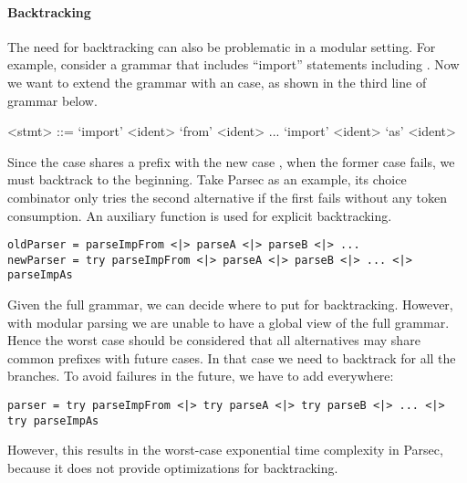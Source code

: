 \paragraph{Backtracking} The need for backtracking can also be problematic
in a modular setting. For example, consider a grammar that includes
``import'' statements including .
Now we want to extend the grammar with an  case, as shown in the third line of grammar below.

\setlength{\grammarindent}{5em}
\begin{grammar}
<stmt> ::= `import' <ident> `from' <ident>
    \alt ...
    \alt `import' <ident> `as' <ident>
\end{grammar}

Since the  case shares a prefix with the new case , when the former case fails, we must backtrack to the beginning. Take Parsec as an example, its choice
combinator \inlinecode{<|>} only tries the second alternative if the first fails
without any token consumption. An auxiliary function  is used for explicit backtracking.

\begin{lstlisting}[language=PlainCode]
oldParser = parseImpFrom <|> parseA <|> parseB <|> ...
newParser = try parseImpFrom <|> parseA <|> parseB <|> ... <|> parseImpAs
\end{lstlisting}

Given the full grammar, we can decide where to put  for backtracking. However, with modular parsing we are unable to have a global view of the full grammar. Hence the worst case should be considered that all alternatives may share common prefixes with future cases. In that case we need to backtrack for all the branches. To avoid failures in the future, we have to add  everywhere:

\begin{lstlisting}[language=PlainCode]
parser = try parseImpFrom <|> try parseA <|> try parseB <|> ... <|> try parseImpAs
\end{lstlisting}

\noindent However, this results in the worst-case exponential time
complexity in Parsec, because it does not provide optimizations
for backtracking.

